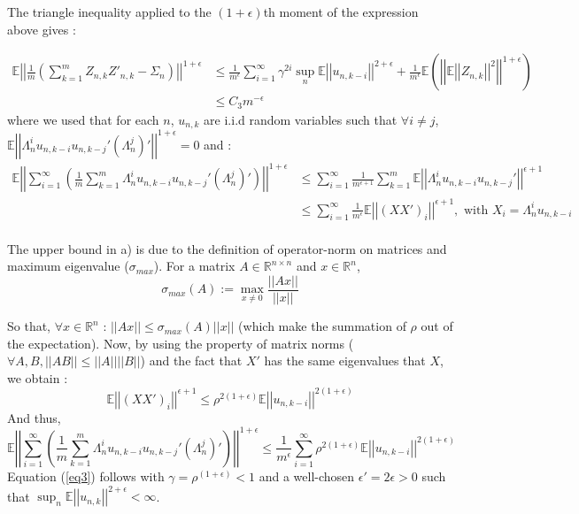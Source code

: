 \documentclass[11pt]{article}
\begin{document}
The triangle inequality applied to the $(1+\epsilon)$th moment of the expression above gives :

\begin{equation}\label{eq3}
\begin{split}
\mathbb{E}\left|\left|\frac{1}{m} \left(\sum_{k=1}^m Z_{n,k}Z'_{n,k} - \Sigma_n \right)\right|\right| ^ {1+\epsilon} & \leq \frac{1}{m^\epsilon} \sum_{i=1}^\infty \gamma^{2i} \sup_{n} \mathbb{E}\left|\left|u_{n,k-i}\right|\right|^{2+\epsilon}
+ \frac{1}{m^\epsilon} \mathbb{E}\left(\left|\left|\mathbb{E}\left|\left|Z_{n,k}\right|\right|^2\right|\right|^{1+\epsilon}\right) \\
& \leq C_3m^{-\epsilon}
\end{split}
\end{equation}
where we used that for each $n$,  $u_{n,k}$ are i.i.d random variables such that $\forall i \neq j$, $\mathbb{E}\left|\left|\Lambda_n^i u_{n,k-i}u_{n,k-j}' (\Lambda_n^j)'\right|\right|^{1+\epsilon} = 0$ and : 
\begin{equation}
\begin{split}
\mathbb{E} \left|\left| \sum_{i=1}^\infty \left(\frac{1}{m} \sum^m_{k=1}  \Lambda_n^i u_{n,k-i}u_{n,k-j}' (\Lambda_n^j)'\right) \right|\right|^{1+\epsilon} & \leq  \sum_{i=1}^\infty \frac{1}{m^{\epsilon +1}} \sum^m_{k=1} \mathbb{E} \left|\left|  \Lambda_n^i u_{n,k-i}u_{n,k-j}' \right| \right|^{\epsilon+1} \\
& \leq  \sum_{i=1}^\infty \frac{1}{m^{\epsilon}}\mathbb{E} \left|\left|(XX')_i\right| \right|^{\epsilon+1} , \text{ with } X_i = \Lambda_n^i u_{n,k-i} \\
\end{split}
\end{equation}

The upper bound in a) is due to the definition of operator-norm on matrices and maximum eigenvalue ($\sigma_{max}$). For a matrix $A \in \mathbb{R}^{n\times n}$ and $x \in \mathbb{R}^n$, 
$$ \sigma_{max}(A) := \max_{x \neq 0 } \frac{\left|\left|Ax \right|\right|}{||x||} $$ 

So that, $\forall x \in \mathbb{R}^n$ : $\left|\left|Ax \right|\right| \leq \sigma_{max}(A)||x||$ (which make the summation of $\rho$ out of the expectation). Now, by using the property of matrix norms ($\forall A,B , ||AB|| \leq ||A||||B||$) and the fact that $X'$ has the same eigenvalues that $X$, we obtain :
$$\mathbb{E} \left|\left|(XX')_i\right| \right|^{\epsilon+1} \leq \rho^{2(1+\epsilon)} \mathbb{E} \left|\left|u_{n,k-i}\right|\right|^{2(1+\epsilon)}$$
And thus,
$$\mathbb{E} \left|\left| \sum_{i=1}^\infty \left(\frac{1}{m} \sum^m_{k=1}  \Lambda_n^i u_{n,k-i}u_{n,k-j}' (\Lambda_n^j)'\right) \right|\right|^{1+\epsilon}  \leq \frac{1}{m^{\epsilon}} \sum_{i=1}^\infty \rho^{2(1+\epsilon)}\mathbb{E} \left|\left|u_{n,k-i}\right|\right|^{2(1+\epsilon)}  $$
Equation (\ref{eq3}) follows with $\gamma = \rho^{(1+\epsilon)} < 1$ and a well-chosen $\epsilon' = 2\epsilon >0$ such that $\sup_n \mathbb{E}\left|\left|u_{n,k}\right|\right|^{2+\epsilon} < \infty$.
\end{document}
